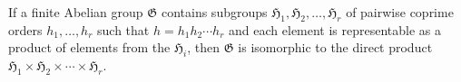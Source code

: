 If a finite Abelian group $\mathfrak{G}$ contains subgroups $\mathfrak{H}_1, \mathfrak{H}_2, \ldots, \mathfrak{H}_r$ of pairwise coprime orders $h_1, \ldots, h_r$ such that $h = h_1 h_2 \cdots h_r$ and each element is representable as a product of elements from the $\mathfrak{H}_i$, then $\mathfrak{G}$ is isomorphic to the direct product $\mathfrak{H}_1 \times \mathfrak{H}_2 \times \cdots \times \mathfrak{H}_r$.
